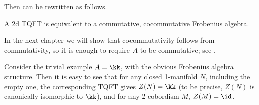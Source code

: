 Then  can be rewritten as follows.
\begin{theorem}\label{t:2d-classification2}
  A 2d TQFT is equivalent to a commutative, cocommutative Frobenius algebra.
\end{theorem}
In the next chapter we will show that cocommutativity follows from
commutativity, so it is enough to require $A$ to be commutative; see
.


\begin{example}\label{x:trivial-2d}
  Consider the trivial example $A=\kk$, with the obvious Frobenius algebra
structure. Then it is easy to see that for any closed 1-manifold $N$, including
the empty one, the corresponding TQFT gives $Z(N)=\kk$ (to be precise,
$Z(N)$ is canonically isomorphic to $\kk$), and for any 2-cobordism $M$,
$Z(M)=\id$.
\end{example}
